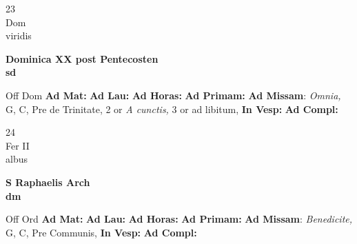 \documentclass[10pt, openany]{book}
\begin{document}
    \begin{center}
        \begin{minipage}{3.5in}
            \vspace{2em}
            \begin{minipage}{0.5in}
                {\Huge 23} \\
                {\normalsize Dom} \\
                {\normalsize viridis}
            \end{minipage}
            \begin{minipage}{3.0in}
                \textbf{ \large Dominica XX post Pentecosten \\
                \textnormal{\normalsize sd}} \\ 
            \end{minipage}
            \begin{justify}Off Dom
                \textbf{Ad Mat: }
                \textbf{Ad Lau: }
                \textbf{Ad Horas: }
                \textbf{Ad Primam: }\textbf{Ad Missam}: \textit{Omnia,} G, C, Pre de Trinitate, 2 or \textit{A cunctis,} 3 or ad libitum,  
                \textbf{In Vesp: }
                \textbf{Ad Compl: }
            \end{justify}
        \end{minipage}
    \end{center}

    \begin{center}
        \begin{minipage}{3.5in}
            \vspace{2em}
            \begin{minipage}{0.5in}
                {\Huge 24} \\
                {\normalsize Fer II} \\
                {\normalsize albus}
            \end{minipage}
            \begin{minipage}{3.0in}
                \textbf{ \large S Raphaelis Arch \\
                \textnormal{\normalsize dm}} \\ 
            \end{minipage}
            \begin{justify}Off Ord
                \textbf{Ad Mat: }
                \textbf{Ad Lau: }
                \textbf{Ad Horas: }
                \textbf{Ad Primam: }\textbf{Ad Missam}: \textit{Benedicite,} G, C, Pre Communis,  
                \textbf{In Vesp: }
                \textbf{Ad Compl: }
            \end{justify}
        \end{minipage}
    \end{center}
\end{document}
